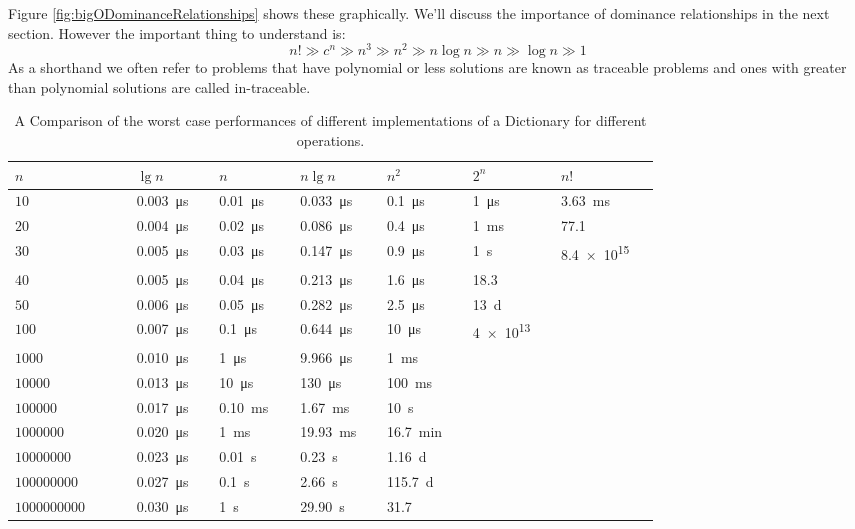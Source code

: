 			Figure \ref{fig:bigODominanceRelationships} shows these graphically. We'll discuss the importance of dominance relationships in the next section. However the important thing to understand is:
			\begin{equation}
				n! \gg c^n \gg n^3 \gg n^2 \gg n \log n \gg n \gg \log n \gg 1
			\end{equation}
		As a shorthand we often refer to problems that have polynomial or less solutions are known as traceable problems and ones with greater than polynomial solutions are called in-traceable.
\begin{table}[t]
	\centering
	\begin{tabular}{>{\scriptsize}L{0.15\linewidth} | >{\scriptsize}L{0.10\linewidth} >{\scriptsize}L{0.10\linewidth} >{\scriptsize}L{0.10\linewidth} >{\scriptsize}L{0.10\linewidth} >{\scriptsize}L{0.10\linewidth} >{\scriptsize}L{0.10\linewidth}}
		\renewcommand{\arraystretch}{0.1}
		$n$				& $\lg n$	& $n$		& $n \lg n$	& $n^2$		& $2^n$		& $n!$		\\
		\hline \hline
		$\num{10}$ 			& \SI{0.003}{\us}	& \SI{0.01}{\us}	& \SI{0.033}{\us}	& \SI{0.1}{\us}		& \SI{1}{\us}		& \SI{3.63}{\ms} 		\\
		$\num{20}$			& \SI{0.004}{\us}	& \SI{0.02}{\us}	& \SI{0.086}{\us}	& \SI{0.4}{\us}		& \SI{1}{\ms}		& \SI{77.1}{\year}		\\
		$\num{30}$			& \SI{0.005}{\us}	& \SI{0.03}{\us}	& \SI{0.147}{\us}	& \SI{0.9}{\us}		& \SI{1}{\s}		& \SI{8.4e15}{\year}	\\
		$\num{40}$			& \SI{0.005}{\us}	& \SI{0.04}{\us}	& \SI{0.213}{\us}	& \SI{1.6}{\us}		& \SI{18.3}{\min}	&						\\
		$\num{50}$			& \SI{0.006}{\us}	& \SI{0.05}{\us}	& \SI{0.282}{\us}	& \SI{2.5}{\us}		& \SI{13}{\day}		&						\\
		\hline
		$\num{100}$			& \SI{0.007}{\us}	& \SI{0.1}{\us}		& \SI{0.644}{\us}	& \SI{10}{\us}		& \SI{4e13}{\year}	&						\\
		$\num{1000}$		& \SI{0.010}{\us}	& \SI{1}{\us}		& \SI{9.966}{\us}	& \SI{1}{\ms}		&					&						\\
		$\num{10000}$		& \SI{0.013}{\us}	& \SI{10}{\us}		& \SI{130}{\us}		& \SI{100}{\ms}		&					&						\\
		$\num{100000}$		& \SI{0.017}{\us}	& \SI{0.10}{\ms}	& \SI{1.67}{\ms}	& \SI{10}{\s}		&					&						\\
		$\num{1000000}$		& \SI{0.020}{\us}	& \SI{1}{\ms}		& \SI{19.93}{\ms}	& \SI{16.7}{\minute}&					&						\\
		$\num{10000000}$	& \SI{0.023}{\us}	& \SI{0.01}{\s}		& \SI{0.23}{\s}		& \SI{1.16}{\day}	&					&						\\
		$\num{100000000}$	& \SI{0.027}{\us}	& \SI{0.1}{\s}		& \SI{2.66}{\s}		& \SI{115.7}{\day}	&					&						\\
		$\num{1000000000}$	& \SI{0.030}{\us}	& \SI{1}{\s}		& \SI{29.90}{\s}	& \SI{31.7}{\year}	&					&						\\
	\end{tabular}
	\caption{\label{tab:BigOComparison} A Comparison of the worst case performances of different implementations of a Dictionary for different operations.}
\end{table}
